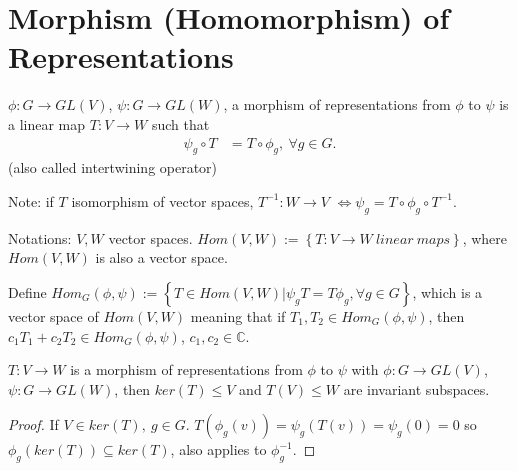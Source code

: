 \documentclass[../../note.tex]{subfiles}
\begin{document}
\section{Morphism (Homomorphism) of Representations}
\begin{definition}
    $\phi: G \rightarrow GL(V)$, $\psi: G \rightarrow GL(W)$, a morphism of representations from $\phi$ to $\psi$ is a linear map $T: V \rightarrow W$ such that 
    \begin{align}
        \psi_g \circ T 
        &= T \circ \phi_g,~\forall g \in G.
    \end{align}
    (also called intertwining operator)
\end{definition}

Note: if $T$ isomorphism of vector spaces, $T^{-1}: W \rightarrow V$ $\Longleftrightarrow \psi_g = T \circ \phi_g \circ T^{-1}$.

Notations: $V, W$ vector spaces. $Hom(V,W):= \left\{T: V \rightarrow W~linear~maps\right\}$, where $Hom(V,W)$ is also a vector space. 

\begin{definition}
    Define $Hom_{G}(\phi, \psi):= \left\{T \in Hom(V,W) \vert \psi_g T = T \phi_g, \forall g \in G \right\}$, which is a vector space of $Hom({V,W})$ meaning that if $T_1, T_2 \in Hom_G(\phi, \psi)$, then $c_1 T_1 + c_2 T_2 \in Hom_G(\phi, \psi)$, $c_1,c_2 \in \mathbb{C}$.
\end{definition}

\begin{proposition}
    $T: V \rightarrow W$ is a morphism of representations from $\phi$ to $\psi$ with $\phi: G \rightarrow GL(V)$, $\psi: G \rightarrow GL(W)$, then $ker(T) \leq V$ and $T(V) \leq W$ are invariant subspaces.
\end{proposition}
\begin{proof}
    If $V \in ker(T),~g \in G$. $T(\phi_g(v)) = \psi_g(T(v)) = \psi_g(0) = 0$ so $\phi_g(ker(T)) \subseteq ker(T)$, also applies to $\phi_g^{-1}$.
\end{proof}
\end{document}
